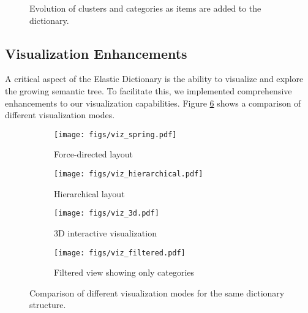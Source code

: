 \documentclass[conference]{IEEEtran}
\begin{document}
\begin{figure}[ht]
\centering
{}
\caption{Evolution of clusters and categories as items are added to the dictionary.}
\label{fig:restructuring}
\end{figure}

\subsection{Visualization Enhancements}

A critical aspect of the Elastic Dictionary is the ability to visualize and explore the growing semantic tree. To facilitate this, we implemented comprehensive enhancements to our visualization capabilities. Figure \ref{fig:viz_comparison} shows a comparison of different visualization modes.

\begin{figure}[ht]
\centering
\begin{subfigure}[b]{0.45\textwidth}
  \texttt{[image: figs/viz\_spring.pdf]}
  \caption{Force-directed layout}
  \label{fig:viz_spring}
\end{subfigure}
\hfill
\begin{subfigure}[b]{0.45\textwidth}
  \texttt{[image: figs/viz\_hierarchical.pdf]}
  \caption{Hierarchical layout}
  \label{fig:viz_hierarchical}
\end{subfigure}

\medskip
\begin{subfigure}[b]{0.45\textwidth}
  \texttt{[image: figs/viz\_3d.pdf]}
  \caption{3D interactive visualization}
  \label{fig:viz_3d}
\end{subfigure}
\hfill
\begin{subfigure}[b]{0.45\textwidth}
  \texttt{[image: figs/viz\_filtered.pdf]}
  \caption{Filtered view showing only categories}
  \label{fig:viz_filtered}
\end{subfigure}
\caption{Comparison of different visualization modes for the same dictionary structure.}
\label{fig:viz_comparison}
\end{figure}
\end{document}
